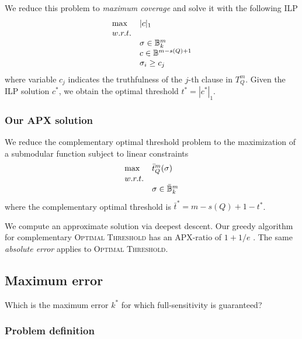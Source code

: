 We reduce this problem to \emph{maximum coverage} \citep{NemhauserWolsey99} and solve it with the following ILP
\begin{equation}
\begin{array}{ll}
\text{max} & |c|_1					\\
w.r.t.							\\
& \sigma \in \mathbb {B}^m_k			\\
& c \in \mathbb {B}^{m - s(Q) + 1}		\\
& \sigma_i \geq c_j				\\
\end{array}
\end{equation}
where variable $c_j$ indicates the truthfulness of the $j$-th clause in $T_{Q}^{m}$. Given the ILP solution $c^*$, we obtain the optimal threshold $t^* = |c^*|_1$.

\subsubsection{Our APX solution}

We reduce the complementary optimal threshold problem to the maximization of a submodular function subject to linear constraints
\begin{equation}
\begin{array}{ll}
\text{max} & \bar{t}_{Q}^{m}(\sigma)		\\
w.r.t.								\\
& \sigma \in \bar{\mathbb {B}}^m_k			\\
\end{array}
\end{equation}
where the complementary optimal threshold is $\bar{t}^* = m - s(Q) + 1 - t^*$.

We compute an approximate solution via deepest descent.
Our greedy algorithm for complementary \textsc{Optimal Threshold} has an APX-ratio of $1 + 1/e$ \citep{NemhauserWolseyFisher78}.
The same \emph{absolute error} applies to \textsc{Optimal Threshold}.

\subsection{Maximum error}

Which is the maximum error $k^*$ for which full-sensitivity is guaranteed?

\subsubsection{Problem definition}

